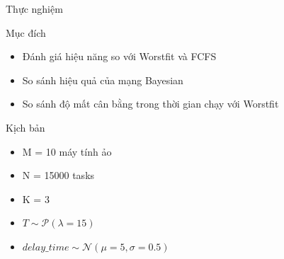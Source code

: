 \documentclass[11pt,xcolor={dvipsnames}, aspectratio=169]{beamer}
\begin{document}
\begin{frame}
{Thực nghiệm}
\pause

\begin{block}
{Mục đích}
	\begin{itemize}
		\item Đánh giá hiệu năng so với Worstfit và FCFS
		\item So sánh hiệu quả của mạng Bayesian
		\item So sánh độ mất cân bằng trong thời gian chạy với Worstfit
	\end{itemize}
\end{block}

\begin{block}
{Kịch bản}
\begin{itemize}
	\item M = 10 máy tính ảo 
	\item N = 15000 tasks
	\item K = 3
	\item $T \sim \mathcal{P}(\lambda = 15)$
	\item $delay\_time \sim \mathcal{N}(\mu = 5, \sigma = 0.5)$
\end{itemize}
\end{block}

\end{frame}
\end{document}
